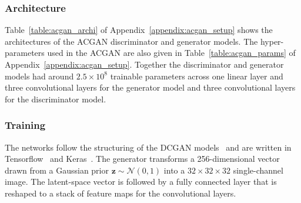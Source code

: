 \documentclass[twocolumn]{article}
\numberwithin{equation}{section}
\begin{document}
\subsubsection{Architecture}
Table~\ref{table:acgan_archi} of Appendix~\ref{appendix:acgan_setup} shows the architectures of the ACGAN discriminator 
and generator models. The hyper-parameters used in the ACGAN are also given in Table~\ref{table:acgan_params} of 
Appendix~\ref{appendix:acgan_setup}. Together the discriminator and generator models had around $2.5\times10^8$ trainable 
parameters across one linear layer and three convolutional layers for the generator model and three convolutional layers 
for the discriminator model. 



\subsubsection{Training}

The networks follow the structuring of the DCGAN models~\cite{dcgan} and are written in Tensorflow~\cite{tensorflow} and 
Keras~\cite{keras}. The generator transforms a 256-dimensional vector drawn from a Gaussian prior $\mathbf{z}\sim 
\mathcal{N}(0,1)$ into a $32 \times 32 \times 32$ single-channel image. The latent-space vector is followed by a fully 
connected layer that is reshaped to a stack of feature maps for the convolutional layers. 
\end{document}
